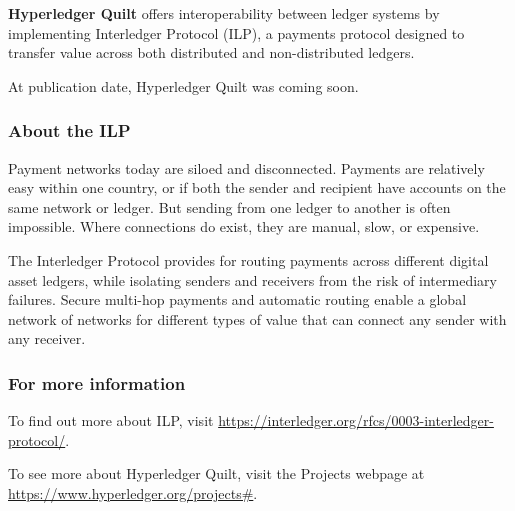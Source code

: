 \textbf{Hyperledger Quilt} offers interoperability between ledger systems by implementing Interledger Protocol (ILP), a payments protocol designed to transfer value across both distributed and non-distributed ledgers. 

At publication date, Hyperledger Quilt was coming soon. 

\subsubsection{About the ILP}
Payment networks today are siloed and disconnected. 
Payments are relatively easy within one country, or if both the sender and recipient have accounts on the same network or ledger. 
But sending from one ledger to another is often impossible. 
Where connections do exist, they are manual, slow, or expensive.

The Interledger Protocol provides for routing payments across different digital asset ledgers, while isolating senders and receivers from the risk of intermediary failures. 
Secure multi-hop payments and automatic routing enable a global network of networks for different types of value that can connect any sender with any receiver.

\subsubsection{For more information}
To find out more about ILP, visit \url{https://interledger.org/rfcs/0003-interledger-protocol/}.

To see more about Hyperledger Quilt, visit the Projects webpage at \url{https://www.hyperledger.org/projects#}.







